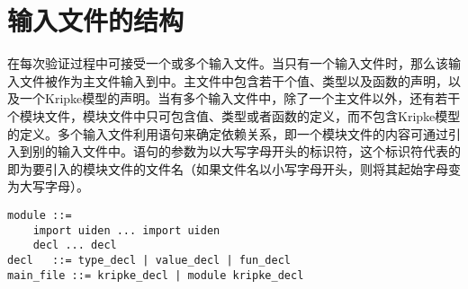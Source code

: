 \section{输入文件的结构}
\sctlprov{}在每次验证过程中可接受一个或多个输入文件。当只有一个输入文件时，那么该输入文件被作为主文件输入到\sctlprov{}中。主文件中包含若干个值、类型以及函数的声明，以及一个Kripke模型的声明。当有多个输入文件中，除了一个主文件以外，还有若干个模块文件，模块文件中只可包含值、类型或者函数的定义，而不包含Kripke模型的定义。多个输入文件利用语句来确定依赖关系，即一个模块文件的内容可通过引入到别的输入文件中。语句的参数为以大写字母开头的标识符，这个标识符代表的即为要引入的模块文件的文件名（如果文件名以小写字母开头，则将其起始字母变为大写字母）。
\begin{verbatim}
module ::= 
    import uiden ... import uiden
    decl ... decl
decl   ::= type_decl | value_decl | fun_decl
main_file ::= kripke_decl | module kripke_decl
\end{verbatim}
\cleardoublepage

%

